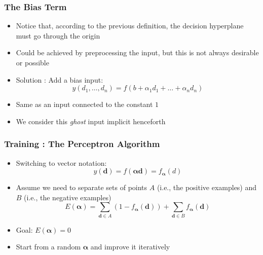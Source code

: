 \documentclass{beamer}
\begin{document}
\begin{frame} \frametitle{The Bias Term}
  \begin{itemize}
  \item Notice that, according to the previous definition, the decision hyperplane must go through the origin
  \item Could be achieved by preprocessing the input, but this is not always desirable or possible
  \item Solution : Add a bias input:
  \begin{equation*}
    y(d_1,\ldots,d_n) = f(b + \alpha_1d_1 + \ldots + \alpha_nd_n)
  \end{equation*}
  \item Same as an input connected to the constant $1$
  \item We consider this {\it ghost} input implicit henceforth
  \end{itemize}
\end{frame}

\begin{frame} \frametitle{Training : The Perceptron Algorithm}
    \begin{itemize}
    \item Switching to vector notation:
        \begin{equation}
            y(\mathbf d) = f(\mathbf \alpha \mathbf d) = f_{\mathbf \alpha}(d)
        \end{equation}
    \item Assume we need to separate sets of points $A$ (i.e., the positive examples) and $B$ (i.e., the negative examples)
        \begin{equation}
            E(\mathbf \alpha) = \displaystyle\sum_{\mathbf d\in A}(1 - f_{\mathbf \alpha}(\mathbf d)) + \displaystyle\sum_{\mathbf d\in B}f_{\mathbf \alpha}(\mathbf d)
        \end{equation}
    \item Goal: $E(\mathbf \alpha) = 0$
    \item Start from a random $\mathbf \alpha$ and improve it iteratively
    \end{itemize}
\end{frame}
\end{document}

